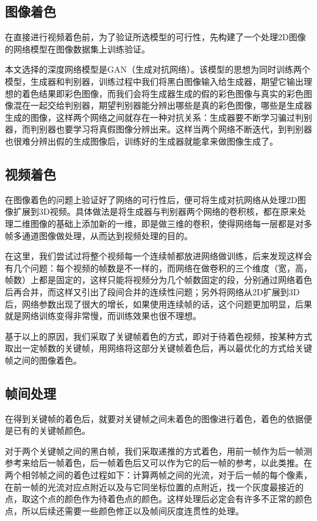 \subsection{图像着色}
\label{sec:image-color}

  在直接进行视频着色前，为了验证所选模型的可行性，先构建了一个处理2D图像的网络模型在图像数据集上训练验证。

  本文选择的深度网络模型是GAN（生成对抗网络）。该模型的思想为同时训练两个模型，生成器和判别器，训练过程中我们将黑白图像输入给生成器，期望它输出理想的着色结果即彩色图像，而我们会将生成器生成的假的彩色图像与真实的彩色图像混在一起交给判别器，期望判别器能分辨出哪些是真的彩色图像，哪些是生成器生成的图像，这样两个网络之间就存在一种对抗关系：生成器要不断学习骗过判别器，而判别器也要学习将真假图像分辨出来。这样当两个网络不断迭代，到判别器也很难分辨出假的生成图像后，训练好的生成器就能拿来做图像生成了。

\subsection{视频着色}
\label{sec:video-color}

  在图像着色的问题上验证好了网络的可行性后，便可将生成对抗网络从处理2D图像扩展到3D视频。具体做法是将生成器与判别器两个网络的卷积核，都在原来处理二维图像的基础上添加新的一维，即是做三维的卷积，使得网络每一层都是对多帧多通道图像做处理，从而达到视频处理的目的。

  在这里，我们尝试过将整个视频每一个连续帧都放进网络做训练，后来发现这样会有几个问题：每个视频的帧数是不一样的，而网络在做卷积的三个维度（宽，高，帧数）上都是固定的，这样只能将视频分为几个帧数固定的段，分别通过网络着色后再合并，而这样又引出了段间合并的连续性问题；另外将网络从2D扩展到3D后，网络参数出现了很大的增长，如果使用连续帧的话，这个问题更加明显，后果就是网络训练变得非常慢，而训练效果也很不理想。

  基于以上的原因，我们采取了关键帧着色的方式，即对于待着色视频，按某种方式取出一定帧数的关键帧，用网络将这部分关键帧着色后，再以最优化的方式给关键帧之间的图像着色。

\subsection{帧间处理}
\label{sec:interframes}

  在得到关键帧的着色后，就要对关键帧之间未着色的图像进行着色，着色的依据便是已有的关键帧颜色。

  对于两个关键帧之间的黑白帧，我们采取递推的方式着色，用前一帧作为后一帧测参考来给后一帧着色，后一帧着色后又可以作为它的后一帧的参考，以此类推。在两个相邻帧之间的着色过程如下：计算两帧之间的光流，对于后一帧的每个像素，在前一帧的光流对应点附近以及与它同坐标位置的点附近，找一个灰度最接近的点，取这个点的颜色作为待着色点的颜色。这样处理后必定会有许多不正常的颜色点，所以后续还需要一些颜色修正以及帧间灰度连贯性的处理。


